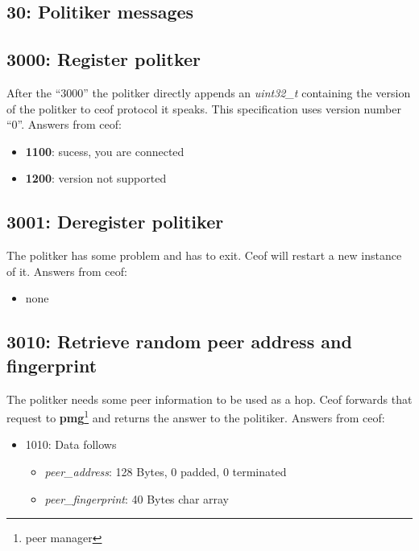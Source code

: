 \documentclass[12pt,a4paper]{book}
\begin{document}
\subsection{30: Politiker messages}
\subsection{3000: Register politker}
After the "`3000"' the politker directly appends an
\textit{uint32\_t} containing the version of the politker to ceof protocol
it speaks. This specification uses version number "`0"'.
Answers from ceof:
\begin{itemize}
\item \textbf{1100}: sucess, you are connected
\item \textbf{1200}: version not supported
\end{itemize}
\subsection{3001: Deregister politiker}
The politker has some problem and has to exit. Ceof will restart a new
instance of it.
Answers from ceof:
\begin{itemize}
\item none
\end{itemize}
\subsection{3010: Retrieve random peer address and fingerprint}
The politker needs some peer information to be used as a hop.
Ceof forwards that request to \textbf{pmg}\footnote{peer manager} and returns
the answer to the politiker.
Answers from ceof:
\begin{itemize}
\item 1010: Data follows
\begin{itemize}
\item \textit{peer\_address}: 128 Bytes, 0 padded, 0 terminated
\item \textit{peer\_fingerprint}: 40 Bytes char array
\end{itemize}
\end{itemize}
\end{document}

